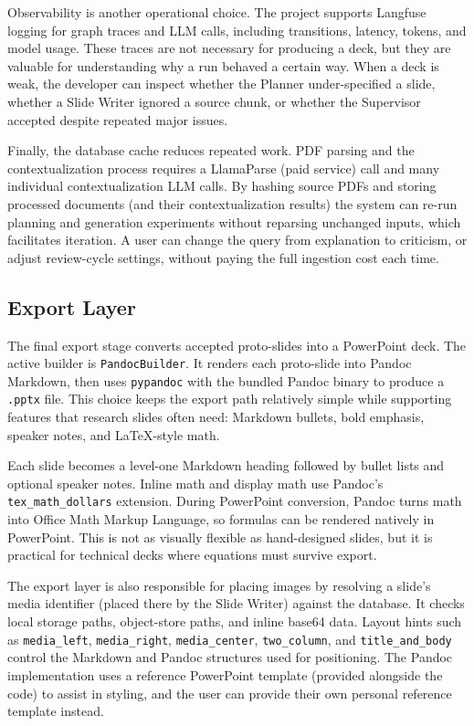 \documentclass[11pt]{article}
\begin{document}
Observability is another operational choice. The project supports Langfuse logging for graph traces and LLM calls, including transitions, latency, tokens, and model usage. These traces are not necessary for producing a deck, but they are valuable for understanding why a run behaved a certain way. When a deck is weak, the developer can inspect whether the Planner under-specified a slide, whether a Slide Writer ignored a source chunk, or whether the Supervisor accepted despite repeated major issues.

Finally, the database cache reduces repeated work. PDF parsing and the contextualization process requires a LlamaParse (paid service) call and many individual contextualization LLM calls. By hashing source PDFs and storing processed documents (and their contextualization results) the system can re-run planning and generation experiments without reparsing unchanged inputs, which facilitates iteration. A user can change the query from explanation to criticism, or adjust review-cycle settings, without paying the full ingestion cost each time.

\subsection{Export Layer}

The final export stage converts accepted proto-slides into a PowerPoint deck. The active builder is \texttt{PandocBuilder}. It renders each proto-slide into Pandoc Markdown, then uses \texttt{pypandoc} with the bundled Pandoc binary to produce a \texttt{.pptx} file. This choice keeps the export path relatively simple while supporting features that research slides often need: Markdown bullets, bold emphasis, speaker notes, and LaTeX-style math.

Each slide becomes a level-one Markdown heading followed by bullet lists and optional speaker notes. Inline math and display math use Pandoc's \texttt{tex\_math\_dollars} extension. During PowerPoint conversion, Pandoc turns math into Office Math Markup Language, so formulas can be rendered natively in PowerPoint. This is not as visually flexible as hand-designed slides, but it is practical for technical decks where equations must survive export.

The export layer is also responsible for placing images by resolving a slide's media identifier (placed there by the Slide Writer) against the database. It checks local storage paths, object-store paths, and inline base64 data. Layout hints such as \texttt{media\_left}, \texttt{media\_right}, \texttt{media\_center}, \texttt{two\_column}, and \texttt{title\_and\_body} control the Markdown and Pandoc structures used for positioning. The Pandoc implementation uses a reference PowerPoint template (provided alongside the code) to assist in styling, and the user can provide their own personal reference template instead.
\end{document}
